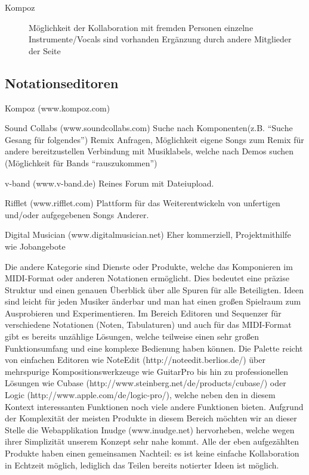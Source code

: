 \documentclass[12pt]{scrartcl}
\begin{document}
\begin{description}
\item[Kompoz]
Möglichkeit der Kollaboration mit fremden Personen
einzelne Instrumente/Vocals sind vorhanden
Ergänzung durch andere Mitglieder der Seite 

\end{description}


\subsection{Notationseditoren}






Kompoz (www.kompoz.com)


Sound Collabs (www.soundcollabs.com)
Suche nach Komponenten(z.B. “Suche Gesang für folgendes”)
Remix Anfragen, Möglichkeit eigene Songs zum Remix für andere bereitzustellen
Verbindung mit Musiklabels, welche nach Demos suchen (Möglichkeit für Bands “rauszukommen”)

v-band (www.v-band.de)
Reines Forum mit Dateiupload.

Rifflet (www.rifflet.com)
Plattform für das Weiterentwickeln von unfertigen und/oder aufgegebenen Songs Anderer.


Digital Musician (www.digitalmusician.net)
Eher kommerziell, Projektmithilfe wie Jobangebote


Die andere Kategorie sind Dienste oder Produkte, welche das Komponieren im MIDI-Format oder anderen Notationen ermöglicht. Dies bedeutet eine präzise Struktur und einen genauen Überblick über alle Spuren für alle Beteiligten. Ideen sind leicht für jeden Musiker änderbar und man hat einen großen Spielraum zum Ausprobieren und Experimentieren.
Im Bereich Editoren und Sequenzer für verschiedene Notationen (Noten, Tabulaturen) und auch für das MIDI-Format gibt es bereits unzählige Lösungen, welche teilweise einen sehr großen Funktionsumfang und eine komplexe Bedienung haben können. Die Palette reicht von einfachen Editoren wie NoteEdit (http://noteedit.berlios.de/) über mehrspurige Kompositionswerkzeuge wie GuitarPro bis hin zu professionellen Lösungen wie Cubase (http://www.steinberg.net/de/products/cubase/) oder Logic (http://www.apple.com/de/logic-pro/), welche neben den in diesem Kontext interessanten Funktionen noch viele andere Funktionen bieten. Aufgrund der Komplexität der meisten Produkte in diesem Bereich möchten wir an dieser Stelle die Webapplikation Inudge (www.inudge.net) hervorheben, welche wegen ihrer Simplizität unserem Konzept sehr nahe kommt.
Alle der eben aufgezählten Produkte haben einen gemeinsamen Nachteil: es ist keine einfache Kollaboration in Echtzeit möglich, lediglich das Teilen bereits notierter Ideen ist möglich.
\end{document}
